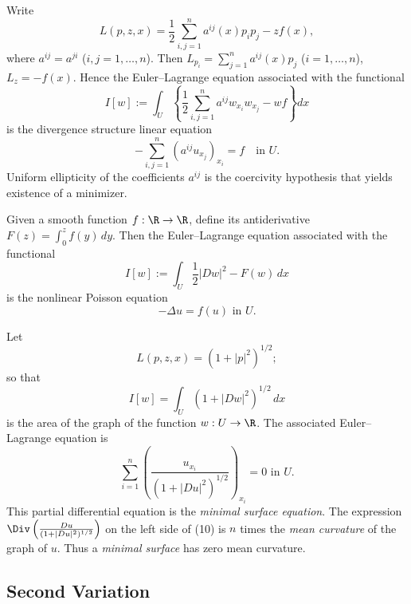 \begin{example}
\label{ex:generalized-dirichlets-principle}
Write
\[
L(p, z, x) = \frac{1}{2}\sum_{i,j=1}^{n} a^{ij}(x) p_i p_j - zf(x),
\]
where $a^{ij} = a^{ji}$ ($i, j = 1, \ldots, n$). Then $L_{p_i} = \sum_{j=1}^{n} a^{ij}(x) p_j$ ($i = 1, \ldots, n$), $L_z = -f(x)$. Hence the Euler--Lagrange equation associated with the functional
\[
I[w] := \int_U \left\{\frac{1}{2}\sum_{i,j=1}^{n} a^{ij} w_{x_i} w_{x_j} - wf\right\} dx
\]
is the divergence structure linear equation
\[
-\sum_{i,j=1}^{n}(a^{ij} u_{x_j})_{x_i} = f \quad \text{in } U.
\]
Uniform ellipticity of the coefficients $a^{ij}$ is the coercivity hypothesis that yields existence of a minimizer.
\end{example}

\begin{example}
\label{ex:nonlinear-poisson-equation-calculus-of-variations}
Given a smooth function $f : \R \to \R$, define its antiderivative $F(z) = \int_0^z f(y)\, dy$. Then the Euler--Lagrange equation associated with the functional
\[
I[w] := \int_U \frac{1}{2}|Dw|^2 - F(w)\, dx
\]
is the nonlinear Poisson equation
\[
-\Delta u = f(u) \text{ in } U.
\]
\end{example}

\begin{example}
\label{ex:minimal-surfaces-calculus-of-variations}
Let
\[
L(p, z, x) = (1 + |p|^2)^{1/2};
\]
so that
\[
I[w] = \int_U (1 + |Dw|^2)^{1/2} \, dx
\]
is the area of the graph of the function $w : U \to \R$. The associated Euler--Lagrange equation is
\[
\sum_{i=1}^{n} \left( \frac{u_{x_i}}{(1 + |Du|^2)^{1/2}} \right)_{x_i} = 0 \text{ in } U.
\tag{10}
\]
This partial differential equation is the \textit{minimal surface equation}. The expression $\Div\left(\frac{Du}{(1+|Du|^2)^{1/2}}\right)$ on the left side of (10) is $n$ times the \textit{mean curvature} of the graph of $u$. Thus a \textit{minimal surface} has zero mean curvature.
\end{example}

\subsection{Second Variation}
\label{sec:second-variation-calculus-of-variations}

